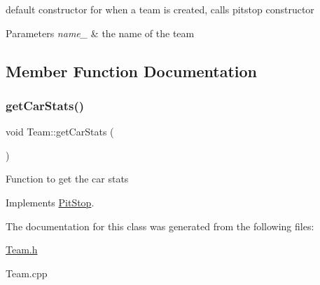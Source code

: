 default constructor for when a team is created, calls pitstop constructor 
\begin{DoxyParams}{Parameters}
{\em name\+\_\+} & the name of the team \\
\hline
\end{DoxyParams}


\subsection{Member Function Documentation}
\mbox{\label{class_team_ac06b2e2837cace2a8aa9b579dcd69a52}} 
\subsubsection{\texorpdfstring{get\+Car\+Stats()}{getCarStats()}}
{\footnotesize\ttfamily void Team\+::get\+Car\+Stats (\begin{DoxyParamCaption}{ }\end{DoxyParamCaption})\hspace{0.3cm}{\ttfamily [virtual]}}

Function to get the car stats 

Implements \mbox{\hyperlink{class_pit_stop_a3a1040306ad9a9e573f488dd2dfc319f}{Pit\+Stop}}.



The documentation for this class was generated from the following files\+:\begin{DoxyCompactItemize}
\item 
\mbox{\hyperlink{_team_8h}{Team.\+h}}\item 
Team.\+cpp\end{DoxyCompactItemize}
